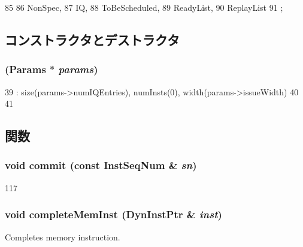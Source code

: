 \begin{DoxyCode}
85                    {
86             NonSpec,
87             IQ,
88             ToBeScheduled,
89             ReadyList,
90             ReplayList
91         };
\end{DoxyCode}


\subsection{コンストラクタとデストラクタ}
\hypertarget{classBackEnd_1_1InstQueue_a679ee5512f178ea331ab7cd3ebf2aa78}{
\subsubsection[{InstQueue}]{ ({\bf Params} $\ast$ {\em params})}}
\label{classBackEnd_1_1InstQueue_a679ee5512f178ea331ab7cd3ebf2aa78}



\begin{DoxyCode}
39     : size(params->numIQEntries), numInsts(0), width(params->issueWidth)
40 {
41 }
\end{DoxyCode}


\subsection{関数}
\hypertarget{classBackEnd_1_1InstQueue_aa72e9e4af0c8be21a633bea0bf0b5fe1}{
\subsubsection[{commit}]{\setlength{\rightskip}{0pt plus 5cm}void commit (const {\bf InstSeqNum} \& {\em sn})}}
\label{classBackEnd_1_1InstQueue_aa72e9e4af0c8be21a633bea0bf0b5fe1}



\begin{DoxyCode}
117 {}
\end{DoxyCode}
\hypertarget{classBackEnd_1_1InstQueue_a2212f511dc1886c073cf7ff1665f5c87}{
\subsubsection[{completeMemInst}]{\setlength{\rightskip}{0pt plus 5cm}void completeMemInst ({\bf DynInstPtr} \& {\em inst})}}
\label{classBackEnd_1_1InstQueue_a2212f511dc1886c073cf7ff1665f5c87}
Completes memory instruction. 


